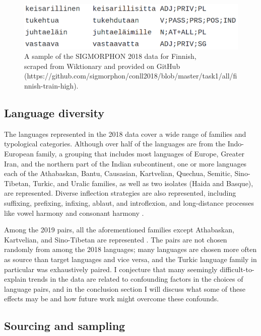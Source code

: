 \begin{figure}[ht]
\includegraphics[width=12cm]{images/sigmorphon2018_fn.png}
\centering
\caption{A sample of the SIGMORPHON 2018 data for Finnish, \\
scraped from Wiktionary and provided on GitHub\\ (https://github.com/sigmorphon/conll2018/blob/master/task1/all/finnish-train-high).}
\label{fig:fintrip}
\end{figure}

\subsection{Language diversity}

The languages represented in the 2018 data cover a wide range of families and typological categories. Although over half of the languages are from the Indo-European family, a grouping that includes most languages of Europe, Greater Iran, and the northern part of the Indian subcontinent, one or more languages each of the Athabaskan, Bantu, Causasian, Kartvelian, Quechua, Semitic, Sino-Tibetan, Turkic, and Uralic families, as well as two isolates (Haida and Basque), are represented. Diverse inflection strategies are also represented, including suffixing, prefixing, infixing, ablaut, and introflexion, and long-distance processes like vowel harmony and consonant harmony \parencite{Cotterell2018b}. 

Among the 2019 pairs, all the aforementioned families except Athabaskan, Kartvelian, and Sino-Tibetan are represented \parencite{McCarthy2019}. The pairs are not chosen randomly from among the 2018 languages; many languages are chosen more often as source than target languages and vice versa, and the Turkic language family in particular was exhaustively paired. I conjecture that many seemingly difficult-to-explain trends in the data are related to confounding factors in the choices of language pairs, and in the conclusion section I will discuss what some of these effects may be and how future work might overcome these confounds.

\subsection{Sourcing and sampling}

